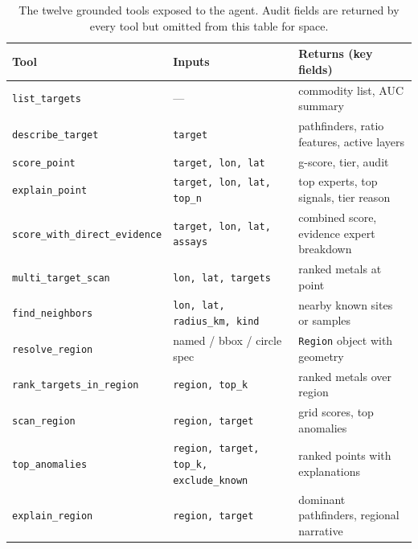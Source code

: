 \documentclass[11pt]{article}
\begin{document}
\begin{table}[t]
  \centering
  \footnotesize
  \begin{tabular}{p{3.4cm}p{4.6cm}p{5.5cm}}
    \toprule
    \textbf{Tool} & \textbf{Inputs} & \textbf{Returns (key fields)} \\
    \midrule
    \texttt{list\_targets} & --- & commodity list, AUC summary \\
    \texttt{describe\_target} & \texttt{target} & pathfinders, ratio features, active layers \\
    \texttt{score\_point} & \texttt{target, lon, lat} & g-score, tier, audit \\
    \texttt{explain\_point} & \texttt{target, lon, lat, top\_n} & top experts, top signals, tier reason \\
    \texttt{score\_with\_direct\_evidence} & \texttt{target, lon, lat, assays} & combined score, evidence expert breakdown \\
    \texttt{multi\_target\_scan} & \texttt{lon, lat, targets} & ranked metals at point \\
    \texttt{find\_neighbors} & \texttt{lon, lat, radius\_km, kind} & nearby known sites or samples \\
    \texttt{resolve\_region} & named / bbox / circle spec & \texttt{Region} object with geometry \\
    \texttt{rank\_targets\_in\_region} & \texttt{region, top\_k} & ranked metals over region \\
    \texttt{scan\_region} & \texttt{region, target} & grid scores, top anomalies \\
    \texttt{top\_anomalies} & \texttt{region, target, top\_k, exclude\_known} & ranked points with explanations \\
    \texttt{explain\_region} & \texttt{region, target} & dominant pathfinders, regional narrative \\
    \bottomrule
  \end{tabular}
  \caption{The twelve grounded tools exposed to the agent. Audit
  fields are returned by every tool but omitted from this table for
  space.}
  \label{tab:tools}
\end{table}

\end{document}
